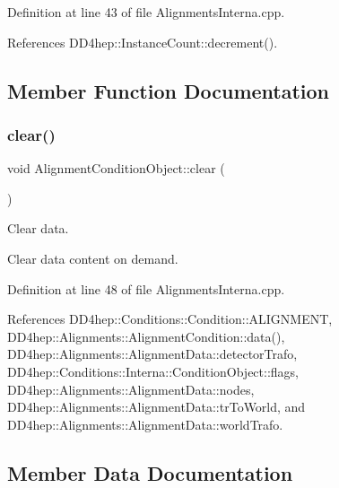 Definition at line 43 of file Alignments\+Interna.\+cpp.



References D\+D4hep\+::\+Instance\+Count\+::decrement().



\subsection{Member Function Documentation}
\hypertarget{class_d_d4hep_1_1_alignments_1_1_interna_1_1_alignment_condition_object_a8290f82fe5e45264993a475a7f532518}{}\label{class_d_d4hep_1_1_alignments_1_1_interna_1_1_alignment_condition_object_a8290f82fe5e45264993a475a7f532518} 
\subsubsection{\texorpdfstring{clear()}{clear()}}
{\footnotesize\ttfamily void Alignment\+Condition\+Object\+::clear (\begin{DoxyParamCaption}{ }\end{DoxyParamCaption})}



Clear data. 

Clear data content on demand. 

Definition at line 48 of file Alignments\+Interna.\+cpp.



References D\+D4hep\+::\+Conditions\+::\+Condition\+::\+A\+L\+I\+G\+N\+M\+E\+NT, D\+D4hep\+::\+Alignments\+::\+Alignment\+Condition\+::data(), D\+D4hep\+::\+Alignments\+::\+Alignment\+Data\+::detector\+Trafo, D\+D4hep\+::\+Conditions\+::\+Interna\+::\+Condition\+Object\+::flags, D\+D4hep\+::\+Alignments\+::\+Alignment\+Data\+::nodes, D\+D4hep\+::\+Alignments\+::\+Alignment\+Data\+::tr\+To\+World, and D\+D4hep\+::\+Alignments\+::\+Alignment\+Data\+::world\+Trafo.



\subsection{Member Data Documentation}
\hypertarget{class_d_d4hep_1_1_alignments_1_1_interna_1_1_alignment_condition_object_ac7ed3f9b51220db13f6d829198f3ea10}{}\label{class_d_d4hep_1_1_alignments_1_1_interna_1_1_alignment_condition_object_ac7ed3f9b51220db13f6d829198f3ea10} 
